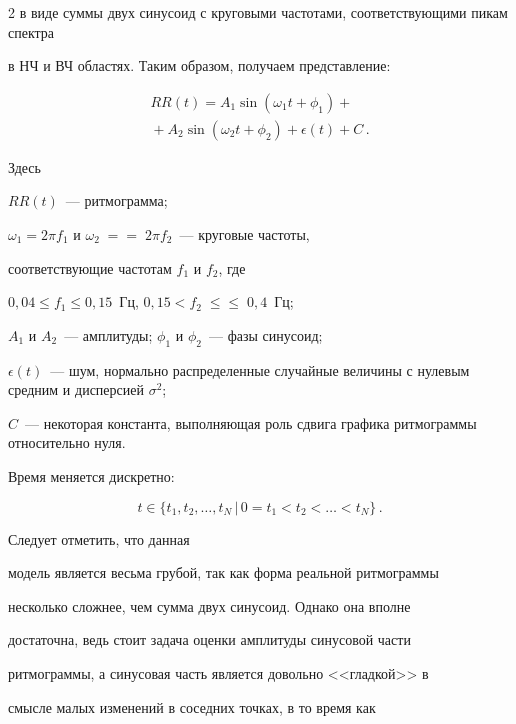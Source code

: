 \begin{multicols}{2}
в виде суммы двух синусоид с круговыми частотами, соответствующими пикам спектра 


в НЧ и ВЧ областях. Таким образом, получаем представление:


\begin{multline}


\label{modelsin}


RR(t) = A_1\sin(\omega_1 t+\phi_1)+{}\\


{}+A_2\sin(\omega_2 t+\phi_2)+\epsilon(t)+C\,.


\end{multline}


Здесь


$RR(t)$~--- ритмограмма;


$\omega_1=2\pi f_1$ и $\omega_2\;=$\linebreak $=\;2\pi f_2$~--- круговые частоты, 


соответствующие час\-то\-там $f_1$ и $f_2$, где


    $0{,}04\leq f_1\leq 0{,}15$~Гц, $0{,}15 <f_2\;\leq$\linebreak $\leq\;0{,}4$~Гц;


 $A_1$ и $A_2$~--- амплитуды; $\phi_1$ и $\phi_2$~--- фазы синусоид;


 $\epsilon(t)$~--- шум, нормально распределенные случайные величины с нулевым средним и дисперсией $\sigma^2$;


 $C$~--- некоторая константа, выполняющая роль сдвига графика ритмограммы относительно нуля.





 Время меняется дискретно: 


 $$


 t \in \{t_1,t_2,\ldots,


t_N\,|\,0=t_1<t_2<\ldots<t_N \}\,.


$$ 


Следует отметить, что данная


модель является весьма грубой, так как форма реальной ритмограммы


несколько сложнее, чем сумма двух синусоид. Однако она вполне


достаточна, ведь стоит задача оценки амплитуды синусовой части


ритмограммы, а синусовая часть является довольно <<гладкой>> в


смысле малых изменений в соседних точках, в то время как



\end{multicols}

